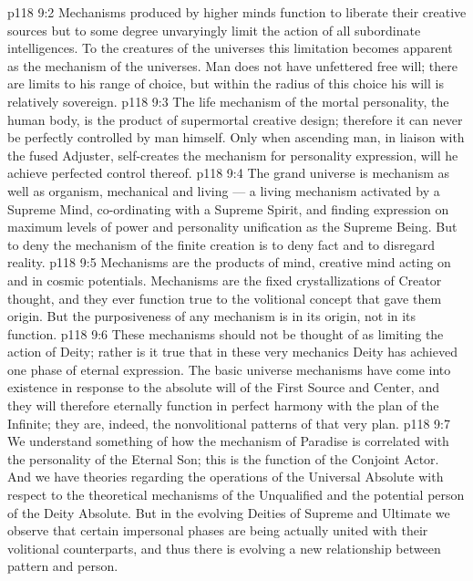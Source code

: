 \vs p118 9:2 Mechanisms produced by higher minds function to liberate their creative sources but to some degree unvaryingly limit the action of all subordinate intelligences. To the creatures of the universes this limitation becomes apparent as the mechanism of the universes. Man does not have unfettered free will; there are limits to his range of choice, but within the radius of this choice his will is relatively sovereign.
\vs p118 9:3 The life mechanism of the mortal personality, the human body, is the product of supermortal creative design; therefore it can never be perfectly controlled by man himself. Only when ascending man, in liaison with the fused Adjuster, self\hyp{}creates the mechanism for personality expression, will he achieve perfected control thereof.
\vs p118 9:4 The grand universe is mechanism as well as organism, mechanical and living --- a living mechanism activated by a Supreme Mind, co\hyp{}ordinating with a Supreme Spirit, and finding expression on maximum levels of power and personality unification as the Supreme Being. But to deny the mechanism of the finite creation is to deny fact and to disregard reality.
\vs p118 9:5 Mechanisms are the products of mind, creative mind acting on and in cosmic potentials. Mechanisms are the fixed crystallizations of Creator thought, and they ever function true to the volitional concept that gave them origin. But the purposiveness of any mechanism is in its origin, not in its function.
\vs p118 9:6 These mechanisms should not be thought of as limiting the action of Deity; rather is it true that in these very mechanics Deity has achieved one phase of eternal expression. The basic universe mechanisms have come into existence in response to the absolute will of the First Source and Center, and they will therefore eternally function in perfect harmony with the plan of the Infinite; they are, indeed, the nonvolitional patterns of that very plan.
\vs p118 9:7 We understand something of how the mechanism of Paradise is correlated with the personality of the Eternal Son; this is the function of the Conjoint Actor. And we have theories regarding the operations of the Universal Absolute with respect to the theoretical mechanisms of the Unqualified and the potential person of the Deity Absolute. But in the evolving Deities of Supreme and Ultimate we observe that certain impersonal phases are being actually united with their volitional counterparts, and thus there is evolving a new relationship between pattern and person.
